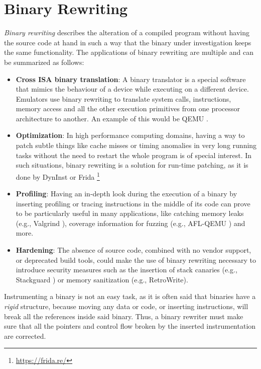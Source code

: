 \documentclass[a4paper,11pt,oneside]{report}
\newcommand{\sysname}{RetroWrite\xspace}
\begin{document}
\section{Binary Rewriting}
\emph{Binary rewriting} describes the alteration of a compiled program without 
having the source code at hand in such a way that the binary under 
investigation keeps the same functionality. The applications of binary 
rewriting are multiple and can be summarized as follows:
\begin{itemize}
	\item \textbf{Cross ISA binary translation}: A binary translator is a special
		software that mimics the behaviour of a device while executing on a
		different device. Emulators use binary rewriting to translate system
		calls, instructions, memory access and all the other execution
		primitives from one processor architecture to another.  An example of
		this would be QEMU \cite{qemu}.

	\item \textbf{Optimization}: In high performance computing domains, having 
		a way to patch subtle things like cache misses or timing anomalies in 
		very long running tasks without the need to restart the whole program 
		is of special interest. In such situations, binary rewriting is a 
		solution for run-time patching, as it is done by DynInst \cite{dyninst} 
		or Frida \footnote{\url{https://frida.re/}}

	\item \textbf{Profiling}: Having an in-depth look during the execution of 
		a binary by inserting profiling or tracing instructions in the middle 
		of its code can prove to be particularly useful in many applications, 
		like catching memory leaks (e.g., Valgrind \cite{valgrind}), coverage 
		information for fuzzing (e.g., AFL-QEMU \cite{afl}) and more.

	\item \textbf{Hardening}: The absence of source code, combined with no 
		vendor support, or deprecated build tools, could make the use of binary 
		rewriting necessary to introduce security measures such as the 
		insertion of stack canaries (e.g., Stackguard \cite{stackguard}) or 
		memory sanitization (e.g., \sysname \cite{dinesh20oakland}).
	
\end{itemize}

Instrumenting a binary is not an easy task, as it is often said that binaries 
have a \emph{rigid} structure, because moving any data or code, or inserting 
instructions, will break all the references inside said binary. Thus, a binary 
rewriter must make sure that all the pointers and control flow broken by the 
inserted instrumentation are corrected.
\end{document}

